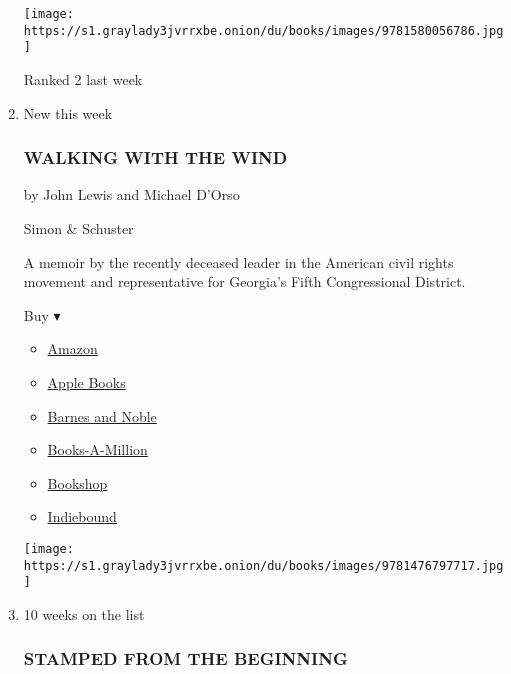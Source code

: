 \begin{enumerate}
  \texttt{[image: https://s1.graylady3jvrrxbe.onion/du/books/images/9781580056786.jpg]}

  Ranked 2 last week
\item
  New this week

  \hypertarget{walking-with-the-wind}{%
  \subsubsection{WALKING WITH THE WIND}\label{walking-with-the-wind}}

  by John Lewis and Michael D'Orso

  Simon \& Schuster

  A memoir by the recently deceased leader in the American civil rights
  movement and representative for Georgia's Fifth Congressional
  District.

  Buy ▾

  \begin{itemize}
  \tightlist
  \item
    \href{https://www.amazon.com/dp/1476797714?tag=NYTBSREV-20\&tag=NYTBS-20}{Amazon}
  \item
    \href{https://du-gae-books-dot-nyt-du-prd.appspot.com/buy?title=WALKING+WITH+THE+WIND\&author=John+Lewis+and+Michael+D\%27Orso}{Apple
    Books}
  \item
    \href{https://www.anrdoezrs.net/click-7990613-11819508?url=https\%3A\%2F\%2Fwww.barnesandnoble.com\%2Fw\%2F\%3Fean\%3D9781476797717}{Barnes
    and Noble}
  \item
    \href{https://www.anrdoezrs.net/click-7990613-35140?url=https\%3A\%2F\%2Fwww.booksamillion.com\%2Fp\%2FWALKING\%2BWITH\%2BTHE\%2BWIND\%2FJohn\%2BLewis\%2Band\%2BMichael\%2BD\%2527Orso\%2F9781476797717}{Books-A-Million}
  \item
    \href{https://bookshop.org/a/3546/9781476797717}{Bookshop}
  \item
    \href{https://www.indiebound.org/book/9781476797717?aff=NYT}{Indiebound}
  \end{itemize}

  \texttt{[image: https://s1.graylady3jvrrxbe.onion/du/books/images/9781476797717.jpg]}
\item
  10 weeks on the list

  \hypertarget{stamped-from-the-beginning}{%
  \subsubsection{STAMPED FROM THE
  BEGINNING}\label{stamped-from-the-beginning}}


\end{enumerate}

